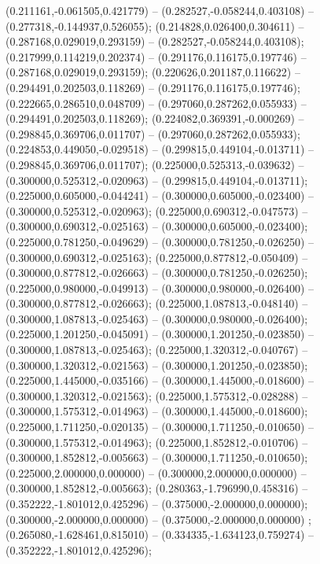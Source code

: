  (0.211161,-0.061505,0.421779) -- (0.282527,-0.058244,0.403108) -- (0.277318,-0.144937,0.526055);
 (0.214828,0.026400,0.304611) -- (0.287168,0.029019,0.293159) -- (0.282527,-0.058244,0.403108);
 (0.217999,0.114219,0.202374) -- (0.291176,0.116175,0.197746) -- (0.287168,0.029019,0.293159);
 (0.220626,0.201187,0.116622) -- (0.294491,0.202503,0.118269) -- (0.291176,0.116175,0.197746);
 (0.222665,0.286510,0.048709) -- (0.297060,0.287262,0.055933) -- (0.294491,0.202503,0.118269);
 (0.224082,0.369391,-0.000269) -- (0.298845,0.369706,0.011707) -- (0.297060,0.287262,0.055933);
 (0.224853,0.449050,-0.029518) -- (0.299815,0.449104,-0.013711) -- (0.298845,0.369706,0.011707);
 (0.225000,0.525313,-0.039632) -- (0.300000,0.525312,-0.020963) -- (0.299815,0.449104,-0.013711);
 (0.225000,0.605000,-0.044241) -- (0.300000,0.605000,-0.023400) -- (0.300000,0.525312,-0.020963);
 (0.225000,0.690312,-0.047573) -- (0.300000,0.690312,-0.025163) -- (0.300000,0.605000,-0.023400);
 (0.225000,0.781250,-0.049629) -- (0.300000,0.781250,-0.026250) -- (0.300000,0.690312,-0.025163);
 (0.225000,0.877812,-0.050409) -- (0.300000,0.877812,-0.026663) -- (0.300000,0.781250,-0.026250);
 (0.225000,0.980000,-0.049913) -- (0.300000,0.980000,-0.026400) -- (0.300000,0.877812,-0.026663);
 (0.225000,1.087813,-0.048140) -- (0.300000,1.087813,-0.025463) -- (0.300000,0.980000,-0.026400);
 (0.225000,1.201250,-0.045091) -- (0.300000,1.201250,-0.023850) -- (0.300000,1.087813,-0.025463);
 (0.225000,1.320312,-0.040767) -- (0.300000,1.320312,-0.021563) -- (0.300000,1.201250,-0.023850);
 (0.225000,1.445000,-0.035166) -- (0.300000,1.445000,-0.018600) -- (0.300000,1.320312,-0.021563);
 (0.225000,1.575312,-0.028288) -- (0.300000,1.575312,-0.014963) -- (0.300000,1.445000,-0.018600);
 (0.225000,1.711250,-0.020135) -- (0.300000,1.711250,-0.010650) -- (0.300000,1.575312,-0.014963);
 (0.225000,1.852812,-0.010706) -- (0.300000,1.852812,-0.005663) -- (0.300000,1.711250,-0.010650);
 (0.225000,2.000000,0.000000) -- (0.300000,2.000000,0.000000) -- (0.300000,1.852812,-0.005663);
 (0.280363,-1.796990,0.458316) -- (0.352222,-1.801012,0.425296) -- (0.375000,-2.000000,0.000000);
 (0.300000,-2.000000,0.000000) -- (0.375000,-2.000000,0.000000) ;
 (0.265080,-1.628461,0.815010) -- (0.334335,-1.634123,0.759274) -- (0.352222,-1.801012,0.425296);
